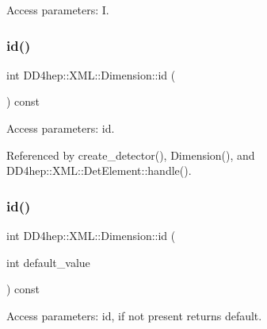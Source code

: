 Access parameters\+: I. 

\hypertarget{struct_d_d4hep_1_1_x_m_l_1_1_dimension_a8cbd93b2d2b12456e84d71711bfdd909}{}\label{struct_d_d4hep_1_1_x_m_l_1_1_dimension_a8cbd93b2d2b12456e84d71711bfdd909} 
\subsubsection{\texorpdfstring{id()}{id()}\hspace{0.1cm}{\footnotesize\ttfamily [1/2]}}
{\footnotesize\ttfamily int D\+D4hep\+::\+X\+M\+L\+::\+Dimension\+::id (\begin{DoxyParamCaption}{ }\end{DoxyParamCaption}) const}



Access parameters\+: id. 



Referenced by create\+\_\+detector(), Dimension(), and D\+D4hep\+::\+X\+M\+L\+::\+Det\+Element\+::handle().

\hypertarget{struct_d_d4hep_1_1_x_m_l_1_1_dimension_a04bd781479123368354dcb93691e17cc}{}\label{struct_d_d4hep_1_1_x_m_l_1_1_dimension_a04bd781479123368354dcb93691e17cc} 
\subsubsection{\texorpdfstring{id()}{id()}\hspace{0.1cm}{\footnotesize\ttfamily [2/2]}}
{\footnotesize\ttfamily int D\+D4hep\+::\+X\+M\+L\+::\+Dimension\+::id (\begin{DoxyParamCaption}\item[{int}]{default\+\_\+value }\end{DoxyParamCaption}) const}



Access parameters\+: id, if not present returns default. 

\hypertarget{struct_d_d4hep_1_1_x_m_l_1_1_dimension_a33a041def50a71bc2520f81856804561}{}\label{struct_d_d4hep_1_1_x_m_l_1_1_dimension_a33a041def50a71bc2520f81856804561} 
